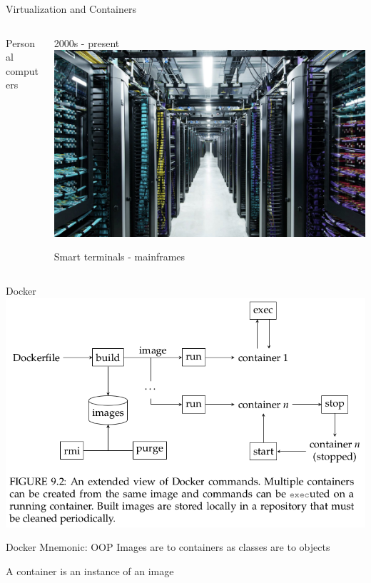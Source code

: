 \documentclass{beamer}
\begin{document}
\begin{frame}{Virtualization and Containers}
\begin{columns}[T]
\begin{column}{.3\linewidth}
Personal computers
\end{column}

\begin{column}{.33\linewidth}
2000s - present
\includegraphics[width=\linewidth]{images/datacenter_fb}

Smart terminals - mainframes
\end{column}
\end{columns}
\end{frame}

\begin{frame}{Docker}
\includegraphics[width=\linewidth]{images/docker_commands}
\end{frame}

\begin{frame}{Docker Mnemonic: OOP}
Images are to containers as classes are to objects

\alert{A container is an instance of an image}
\end{frame}
\end{document}
